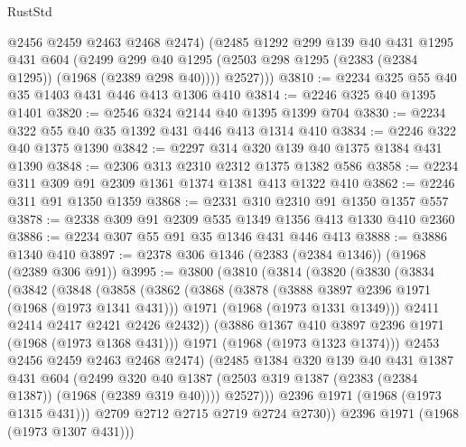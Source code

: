 \begin{lexlean}{RustStd}
\begin{coremodule}
          @2456
          @2459
          @2463
          @2468
          @2474)
        (@2485
          @1292
          @299
          @139
          @40
          @431
          @1295
          @431
          @604
          (@2499 @299 @40 @1295 (@2503 @298 @1295 (@2383 (@2384 @1295)) (@1968 (@2389 @298 @40))))
          @2527)))
@3810 := @2234 @325 @55 @40 @35 @1403 @431 @446 @413 @1306 @410
@3814 := @2246 @325 @40 @1395 @1401
@3820 := @2546 @324 @2144 @40 @1395 @1399 @704
@3830 := @2234 @322 @55 @40 @35 @1392 @431 @446 @413 @1314 @410
@3834 := @2246 @322 @40 @1375 @1390
@3842 := @2297 @314 @320 @139 @40 @1375 @1384 @431 @1390
@3848 := @2306 @313 @2310 @2312 @1375 @1382 @586
@3858 := @2234 @311 @309 @91 @2309 @1361 @1374 @1381 @413 @1322 @410
@3862 := @2246 @311 @91 @1350 @1359
@3868 := @2331 @310 @2310 @91 @1350 @1357 @557
@3878 := @2338 @309 @91 @2309 @535 @1349 @1356 @413 @1330 @410 @2360
@3886 := @2234 @307 @55 @91 @35 @1346 @431 @446 @413
@3888 := @3886 @1340 @410
@3897 := @2378 @306 @1346 (@2383 (@2384 @1346)) (@1968 (@2389 @306 @91))
@3995 := @3800
    (@3810
      (@3814
        (@3820
          (@3830
            (@3834
              (@3842
                (@3848
                  (@3858
                    (@3862
                      (@3868
                        (@3878
                          (@3888 @3897 @2396 @1971 (@1968 (@1973 @1341 @431)))
                          @1971
                          (@1968 (@1973 @1331 @1349)))
                        @2411
                        @2414
                        @2417
                        @2421
                        @2426
                        @2432))
                    (@3886 @1367 @410 @3897 @2396 @1971 (@1968 (@1973 @1368 @431)))
                    @1971
                    (@1968 (@1973 @1323 @1374)))
                  @2453
                  @2456
                  @2459
                  @2463
                  @2468
                  @2474)
                (@2485
                  @1384
                  @320
                  @139
                  @40
                  @431
                  @1387
                  @431
                  @604
                  (@2499
                    @320
                    @40
                    @1387
                    (@2503 @319 @1387 (@2383 (@2384 @1387)) (@1968 (@2389 @319 @40))))
                  @2527)))
            @2396
            @1971
            (@1968 (@1973 @1315 @431)))
          @2709
          @2712
          @2715
          @2719
          @2724
          @2730))
      @2396
      @1971
      (@1968 (@1973 @1307 @431)))

\end{coremodule}
\end{lexlean}
